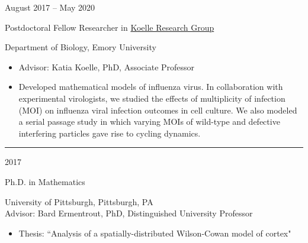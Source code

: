 \documentclass[a4paper,10pt]{article}
\newlength{\cvcolumngapwidth}
\newlength{\cvleftcolumnwidth}
\newlength{\cvrightcolumnwidth}
\newcommand{\cvsectionstyle}[1]{{\normalsize\cvsectionfont\textcolor{cvsectioncolor}{#1}}}
\newcommand{\cvtitlestyle}[1]{{\large\cvtitlefont\textcolor{cvtitlecolor}{#1}}}
\newcommand{\cvdurationstyle}[1]{{\small\cvdurationfont\textcolor{cvdurationcolor}{#1}}}
\newlength{\cvafteritemskipamount}
\newlength{\cvaftersectionskipamount}
\newlength{\cvbetweensectionandheadingextraskipamount}
\newlength{\cvaftertitleskipamount}
\newlength{\cvparskip}
\newcommand{\cvsection}[1]{
            \begin{minipage}[t]{\cvleftcolumnwidth}
                \raggedleft\cvsectionstyle{#1}
            \end{minipage}%
            \hspace{\cvcolumngapwidth}%
            \begin{minipage}[t]{\cvrightcolumnwidth}
                \textcolor{cvrulecolor}{\rule{\cvrightcolumnwidth}{0.3mm}}
            \end{minipage}
        
            \vspace{\cvaftersectionskipamount}
        }
\newcommand{\cvitem}[2]{
            \begin{minipage}[t]{\cvleftcolumnwidth}
                \raggedleft #1
            \end{minipage}%
            \hspace{\cvcolumngapwidth}%
            \begin{minipage}[t]{\cvrightcolumnwidth}
                \setlength{\parskip}{\cvparskip} #2
            \end{minipage}
        
            \vspace{\cvafteritemskipamount}
        }
\newcommand{\cvtitle}[1]{
            \cvtitlestyle{#1}
        
            \vspace{\cvaftertitleskipamount}
            \vspace{-\cvparskip}
        }
\begin{document}
        \cvitem{
            \cvdurationstyle{August 2017 -- May 2020}
        }{
            \cvtitle{Postdoctoral Fellow Researcher in \href{https://scholarblogs.emory.edu/koellelab/}{Koelle Research Group}}
        
        	Department of Biology, Emory University %
        
            \begin{itemize}[leftmargin=*]
            	\item Advisor: Katia Koelle, PhD, Associate Professor
                \item Developed mathematical models of influenza virus. In collaboration with experimental virologists, we studied the effects of multiplicity of infection (MOI) on influenza viral infection outcomes in cell culture. We also modeled a serial passage study in which varying MOIs of wild-type and defective interfering particles gave rise to cycling dynamics. 
        
            \end{itemize}
        }
        
        
        
        
        \cvsection{EDUCATION}
        \vspace{\cvbetweensectionandheadingextraskipamount}
        
        \cvitem{
            \cvdurationstyle{2017}
        }{
            \cvtitle{Ph.D. in Mathematics}
        	
        	University of Pittsburgh, Pittsburgh, PA \\
            	Advisor: Bard Ermentrout, PhD, Distinguished University Professor
        
            \begin{itemize}[leftmargin=*]
                \item Thesis: ``Analysis of a spatially-distributed Wilson-Cowan model of cortex"
            \end{itemize}
        }
        
\end{document}
